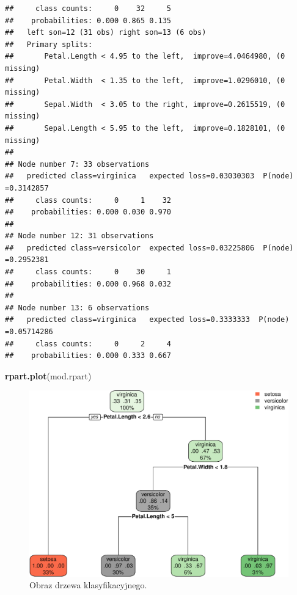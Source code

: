 \documentclass[
]{book}
\newenvironment{Shaded}{\begin{snugshade}}{\end{snugshade}}
\newcommand{\FunctionTok}[1]{\textcolor[rgb]{0.13,0.29,0.53}{\textbf{#1}}}
\newcommand{\NormalTok}[1]{#1}
\theoremstyle{plain}
\theoremstyle{definition}
\theoremstyle{definition}
\theoremstyle{definition}
\theoremstyle{definition}
\theoremstyle{definition}
\theoremstyle{remark}
\begin{document}
\begin{verbatim}
##     class counts:     0    32     5
##    probabilities: 0.000 0.865 0.135 
##   left son=12 (31 obs) right son=13 (6 obs)
##   Primary splits:
##       Petal.Length < 4.95 to the left,  improve=4.0464980, (0 missing)
##       Petal.Width  < 1.35 to the left,  improve=1.0296010, (0 missing)
##       Sepal.Width  < 3.05 to the right, improve=0.2615519, (0 missing)
##       Sepal.Length < 5.95 to the left,  improve=0.1828101, (0 missing)
## 
## Node number 7: 33 observations
##   predicted class=virginica   expected loss=0.03030303  P(node) =0.3142857
##     class counts:     0     1    32
##    probabilities: 0.000 0.030 0.970 
## 
## Node number 12: 31 observations
##   predicted class=versicolor  expected loss=0.03225806  P(node) =0.2952381
##     class counts:     0    30     1
##    probabilities: 0.000 0.968 0.032 
## 
## Node number 13: 6 observations
##   predicted class=virginica   expected loss=0.3333333  P(node) =0.05714286
##     class counts:     0     2     4
##    probabilities: 0.000 0.333 0.667
\end{verbatim}

\begin{Shaded}
\begin{Highlighting}[]
\FunctionTok{rpart.plot}\NormalTok{(mod.rpart)}
\end{Highlighting}
\end{Shaded}

\begin{figure}
\centering
\includegraphics{EksploracjaDanych_files/figure-latex/unnamed-chunk-15-1.pdf}
\caption{\label{fig:unnamed-chunk-15}Obraz drzewa klasyfikacyjnego.}
\end{figure}
\end{document}
